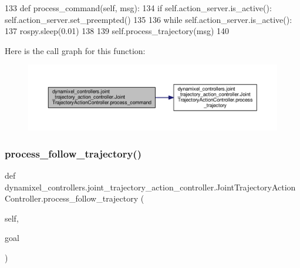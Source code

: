 \begin{DoxyCode}
133     \textcolor{keyword}{def }process\_command(self, msg):
134         \textcolor{keywordflow}{if} self.action\_server.is\_active(): self.action\_server.set\_preempted()
135         
136         \textcolor{keywordflow}{while} self.action\_server.is\_active():
137             rospy.sleep(0.01)
138             
139         self.process\_trajectory(msg)
140 
\end{DoxyCode}
Here is the call graph for this function\+:
\nopagebreak
\begin{figure}[H]
\begin{center}
\leavevmode
\includegraphics[width=350pt]{d1/d22/classdynamixel__controllers_1_1joint__trajectory__action__controller_1_1_joint_trajectory_action_controller_a86f9e610dbac6f1de79f4ff95448daa9_cgraph}
\end{center}
\end{figure}
\mbox{\label{classdynamixel__controllers_1_1joint__trajectory__action__controller_1_1_joint_trajectory_action_controller_afbfa29ff56121dd37e2dc579e8a32da2}} 
\subsubsection{\texorpdfstring{process\+\_\+follow\+\_\+trajectory()}{process\_follow\_trajectory()}}
{\footnotesize\ttfamily def dynamixel\+\_\+controllers.\+joint\+\_\+trajectory\+\_\+action\+\_\+controller.\+Joint\+Trajectory\+Action\+Controller.\+process\+\_\+follow\+\_\+trajectory (\begin{DoxyParamCaption}\item[{}]{self,  }\item[{}]{goal }\end{DoxyParamCaption})}



